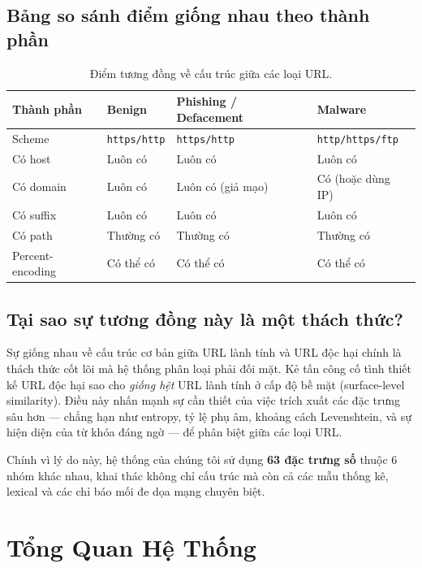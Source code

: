 \documentclass[a4paper,12pt]{article}
\begin{document}
\subsection{Bảng so sánh điểm giống nhau theo thành phần}

\begin{table}[H]
\centering
\caption{Điểm tương đồng về cấu trúc giữa các loại URL.}
\label{tab:similarities}
\begin{tabular}{p{2.8cm}p{3cm}p{3cm}p{3cm}}
\toprule
\textbf{Thành phần} & \textbf{Benign} & \textbf{Phishing / Defacement} & \textbf{Malware} \\
\midrule
Scheme & \texttt{https/http} & \texttt{https/http} & \texttt{http/https/ftp} \\
Có host & Luôn có & Luôn có & Luôn có \\
Có domain & Luôn có & Luôn có (giả mạo) & Có (hoặc dùng IP) \\
Có suffix & Luôn có & Luôn có & Luôn có \\
Có path & Thường có & Thường có & Thường có \\
Percent-encoding & Có thể có & Có thể có & Có thể có \\
\bottomrule
\end{tabular}
\end{table}

\subsection{Tại sao sự tương đồng này là một thách thức?}

Sự giống nhau về cấu trúc cơ bản giữa URL lành tính và URL độc hại chính là thách thức cốt lõi mà hệ thống phân loại phải đối mặt. Kẻ tấn công cố tình thiết kế URL độc hại sao cho \textit{giống hệt} URL lành tính ở cấp độ bề mặt (surface-level similarity). Điều này nhấn mạnh sự cần thiết của việc trích xuất các đặc trưng sâu hơn --- chẳng hạn như entropy, tỷ lệ phụ âm, khoảng cách Levenshtein, và sự hiện diện của từ khóa đáng ngờ --- để phân biệt giữa các loại URL.

Chính vì lý do này, hệ thống của chúng tôi sử dụng \textbf{63 đặc trưng số} thuộc 6 nhóm khác nhau, khai thác không chỉ cấu trúc mà còn cả các mẫu thống kê, lexical và các chỉ báo mối đe dọa mạng chuyên biệt.

\section{Tổng Quan Hệ Thống}
\label{sec:overview}
\end{document}

